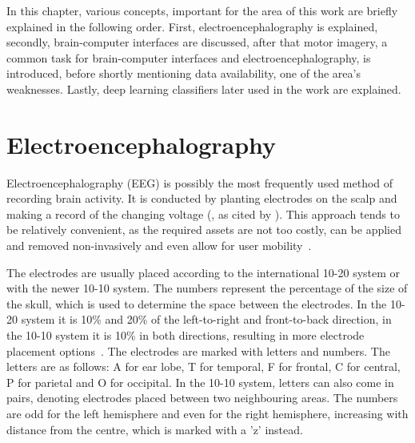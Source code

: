 \documentclass[english, he, bc, kiv, iso690alph, viewonly]{fasthesis}
\begin{document}
In this chapter, various concepts, important for the area of this work are briefly explained in the following order. First, electroencephalography is explained, secondly, brain-computer interfaces are discussed, after that motor imagery, a common task for brain-computer interfaces and electroencephalography, is introduced, before shortly mentioning data availability, one of the area's weaknesses. Lastly, deep learning classifiers later used in the work are explained.

\section{Electroencephalography}

Electroencephalography (EEG) is possibly the most frequently used method of recording brain activity. It is conducted by planting electrodes on the scalp and making a record of the changing voltage (\cite{berger:eeg:29}, as cited by \cite{luck:erp:book}). This approach tends to be relatively convenient, as the required assets are not too costly, can be applied and removed non-invasively and even allow for user mobility~\cite{padfield:bci:19}.

The electrodes are usually placed according to the international 10-20 system or with the newer 10-10 system. The numbers represent the percentage of the size of the skull, which is used to determine the space between the electrodes. In the 10-20 system it is 10\% and 20\% of the left-to-right and front-to-back direction, in the 10-10 system it is 10\% in both directions, resulting in more electrode placement options~\cite{acharya:channels:16}. The electrodes are marked with letters and numbers. The letters are as follows: A for ear lobe, T for temporal, F  for frontal, C for central, P for parietal and O for occipital. In the 10-10 system, letters can also come in pairs, denoting electrodes placed between two neighbouring areas. The numbers are odd for the left hemisphere and even for the right hemisphere, increasing with distance from the centre, which is marked with a 'z' instead.
\end{document}
